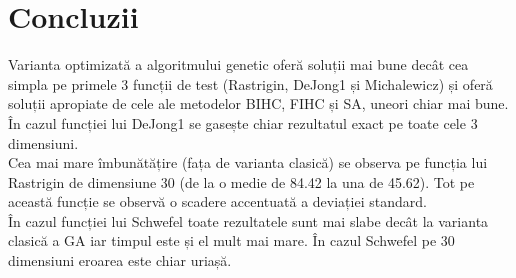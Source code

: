 \documentclass{article}
\begin{document}

\section{Concluzii}
Varianta optimizată a algoritmului genetic oferă soluții mai bune decât cea simpla pe primele 3 funcții de test (Rastrigin, DeJong1 și Michalewicz) și oferă soluții apropiate de cele ale metodelor BIHC, FIHC și SA, uneori chiar mai bune. În cazul funcției lui DeJong1 se gasește chiar rezultatul exact pe toate cele 3 dimensiuni.\\
Cea mai mare îmbunătățire (fața de varianta clasică) se observa pe funcția lui Rastrigin de dimensiune 30 (de la o medie de 84.42 la una de 45.62). Tot pe această funcție se observă o scadere accentuată a deviației standard.\\
În cazul funcției lui Schwefel toate rezultatele sunt mai slabe decât la varianta clasică a GA iar timpul este și el mult mai mare. În cazul Schwefel pe 30 dimensiuni eroarea este chiar uriașă.
\end{document}
